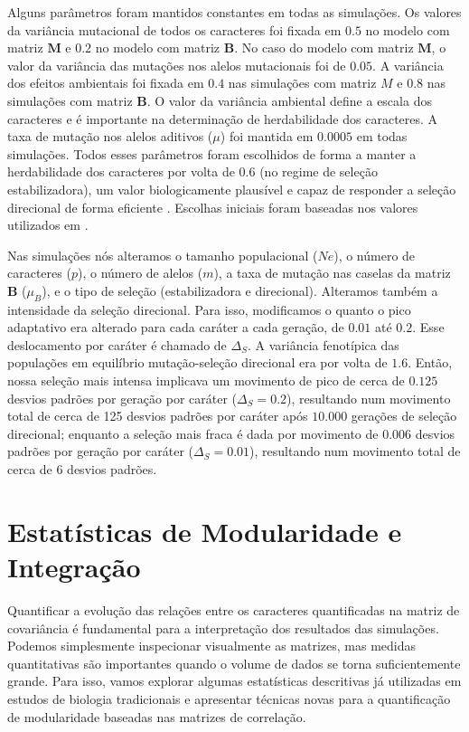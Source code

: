 Alguns parâmetros foram mantidos constantes em todas as simulações.  Os
valores da variância mutacional de todos os caracteres foi fixada em
$0.5$ no modelo com matriz $\mathbf{M}$ e $0.2$ no modelo com matriz $\mathbf{B}$.
No caso do modelo com matriz $\mathbf{M}$, o valor da variância das mutações nos
alelos mutacionais foi de $0.05$.
A variância dos efeitos ambientais foi fixada em $0.4$ nas simulações com
matriz $M$ e $0.8$ nas simulações com matriz $\mathbf{B}$.
O valor da variância ambiental define a escala dos caracteres e é importante
na determinação de herdabilidade dos caracteres.
A taxa de mutação nos alelos aditivos ($\mu$) foi mantida em $0.0005$ em
todas simulações.
Todos esses parâmetros foram escolhidos de forma a manter a
herdabilidade dos caracteres por volta de $0.6$ (no regime de seleção
estabilizadora), um valor biologicamente plausível e capaz de responder
a seleção direcional de forma eficiente \citep{Cheverud1988}.
Escolhas iniciais foram baseadas nos valores utilizados em
\cite{Jones2003, Jones2004, Jones2007}.

Nas simulações nós alteramos o tamanho populacional ($Ne$), o número de
caracteres ($p$), o número de alelos ($m$), a taxa de mutação nas caselas da
matriz $\mathbf{B}$ ($\mu_B$), e o tipo de seleção (estabilizadora e direcional).
Alteramos também a intensidade da seleção direcional.
Para isso, modificamos o quanto o pico adaptativo era alterado para cada
caráter a cada geração, de $0.01$ até $0.2$.
Esse deslocamento por caráter é chamado de $\Delta_S$.
A variância fenotípica das populações em equilíbrio mutação-seleção
direcional era por volta de $1.6$.
Então, nossa seleção mais intensa implicava um movimento de pico de
cerca de $0.125$ desvios padrões por geração por caráter ($\Delta_S=0.2$),
resultando num movimento total de cerca de 125 desvios padrões por caráter
após $10.000$ gerações de seleção direcional; enquanto a seleção mais
fraca é dada por movimento de $0.006$ desvios padrões por geração por caráter
($\Delta_S=0.01$), resultando num movimento total de cerca de 6 desvios
padrões.

\section{Estatísticas de Modularidade e Integração}

Quantificar a evolução das relações entre os caracteres quantificadas na
matriz de covariância é fundamental para a interpretação dos resultados
das simulações.
Podemos simplesmente inspecionar visualmente as matrizes, mas medidas
quantitativas são importantes quando o volume de dados se torna
suficientemente grande.
Para isso, vamos explorar algumas estatísticas descritivas já utilizadas em
estudos de biologia tradicionais e apresentar técnicas novas para a
quantificação de modularidade baseadas nas matrizes de correlação.

